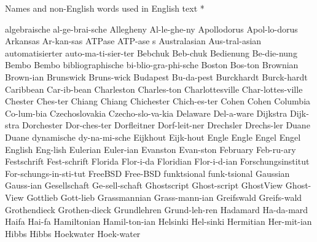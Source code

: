 \head * Names and non-English words \break used in English text *

\begingroup
\eightpoint
\1 algebraische 	al-ge-brai-sche
\1 Allegheny		Al-le-ghe-ny
\NewWordtrue
\1 Apollodorus		Apol-lo-dorus		%
\1 Arkansas		Ar-kan-sas
\5 ATPase		ATP-ase s		%
\1 Australasian 	Aus-tral-asian
\1 automatisierter	auto-ma-ti-sier-ter
\NewWordtrue
\1 Bebchuk		Beb-chuk		%
\1 Bedienung		Be-die-nung
\1 Bembo                Bembo			%
\1 bibliographische	bi-blio-gra-phi-sche
\1 Boston		Bos-ton
\1 Brownian		Brown-ian
\1 Brunswick		Bruns-wick
\1 Budapest		Bu-da-pest
\NewWordtrue
\1 Burckhardt		Burck-hardt		%
\1 Caribbean		Car-ib-bean
\1 Charleston		Charles-ton
\1 Charlottesville	Char-lottes-ville
\NewWordtrue
\1 Chester		Ches-ter		%
\NewWordtrue
\1 Chiang		Chiang			%
\NewWordtrue
\1 Chichester		Chich-es-ter		%
\NewWordtrue
\1 Cohen		Cohen			%
\1 Columbia		Co-lum-bia
\1 Czechoslovakia	Czecho-slo-va-kia
\1 Delaware		Del-a-ware		%
\1 Dijkstra		Dijk-stra
\1 Dorchester		Dor-ches-ter		%
\NewWordtrue
\1 Dorfleitner		Dorf-leit-ner		%
\NewWordtrue
\1 Drechsler		Drechs-ler		%
\1 Duane		Duane			%
\1 dynamische		dy-na-mi-sche
\NewWordtrue
\1 Eijkhout		Eijk-hout		%
\NewWordtrue
\1 Engle		Engle			%
\NewWordtrue
\1 Engel		Engel			%
\1 English		Eng-lish
\1 Eulerian		Euler-ian
\1 Evanston		Evan-ston
\1 February		Feb-ru-ary
\1 Festschrift		Fest-schrift
\1 Florida		Flor-i-da
\1 Floridian		Flor-i-d-ian
\1 Forschungsinstitut	For-schungs-in-sti-tut
\1 FreeBSD		Free-BSD		%
\1 funktsional		funk-tsional
\1 Gaussian		Gauss-ian
\NewWordtrue
\1 Gesellschaft 	Ge-sell-schaft		%
\1 Ghostscript		Ghost-script		%
\1 GhostView		Ghost-View		%
\NewWordtrue
\1 Gottlieb		Gott-lieb		%
\1 Grassmannian		Grass-mann-ian		%
\1 Greifswald		Greifs-wald
\1 Grothendieck		Grothen-dieck
\1 Grundlehren		Grund-leh-ren
\1 Hadamard		Ha-da-mard		%
\1 Haifa		Hai-fa
\1 Hamiltonian		Hamil-ton-ian
\1 Helsinki		Hel-sinki
\1 Hermitian		Her-mit-ian
\1 Hibbs		Hibbs
\1 Hoekwater		Hoek-water		%
